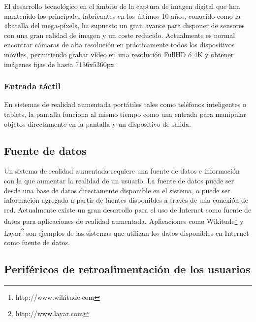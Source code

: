 El desarrollo tecnológico en el ámbito de la captura de imagen digital que han mantenido los principales fabricantes en los últimos 10 años, conocido como la «batalla del mega-píxel», ha supuesto un gran avance para disponer de sensores con una gran calidad de imagen y un coste reducido. Actualmente es normal encontrar cámaras de alta resolución en prácticamente todos los dispositivos móviles, permitiendo grabar vídeo en una resolución FullHD ó 4K y obtener imágenes fijas de hasta 7136x5360px.

\subsubsection{Entrada táctil}
En sistemas de realidad aumentada portátiles tales como teléfonos inteligentes o tablets, la pantalla funciona al mismo tiempo como una entrada para manipular objetos directamente en la pantalla y un dispositivo de salida.

\subsection{Fuente de datos}
Un sistema de realidad aumentada requiere una fuente de datos e información con la que aumentar la realidad de un usuario. La fuente de datos puede ser desde una base de datos directamente disponible en el sistema, o puede ser información agregada a partir de fuentes disponibles a través de una conexión de red. Actualmente existe un gran desarrollo para el uso de Internet como fuente de datos para aplicaciones de realidad aumentada. Aplicaciones como Wikitude\footnote{http://www.wikitude.com} y Layar\footnote{http://www.layar.com} son ejemplos de las sistemas que utilizan los datos disponibles en Internet como fuente de datos.

\subsection{Periféricos de retroalimentación de los usuarios}
